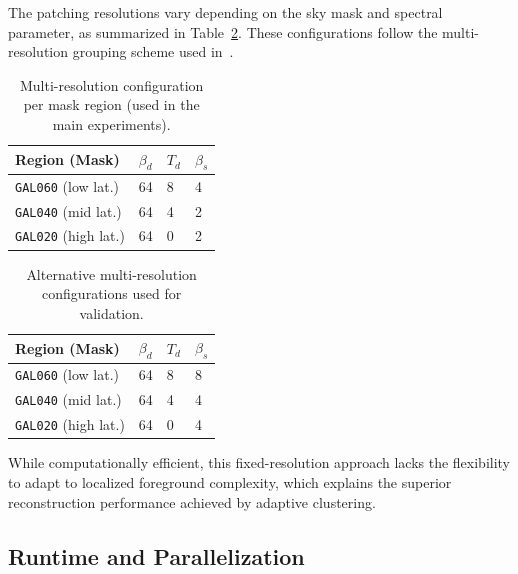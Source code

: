 \documentclass[fleqn,usenatbib]{mnras}
\begin{document}
The patching resolutions vary depending on the sky mask and spectral parameter, as summarized in Table~\ref{tab:multires_config}. These configurations follow the multi-resolution grouping scheme used in~\citep{LiteBIRD_PTEP_2022}.

\begin{table}
    \centering
    \small
    \caption{Multi-resolution configuration per mask region (used in the main experiments).}
    \begin{tabular}{@{}p{3.5cm}|p{1.5cm}@{}|p{1.5cm}@{}|p{1.5cm}@{}}
        \toprule
        \textbf{Region (Mask)} & \( \beta_d \) & \( T_d \) & \( \beta_s \) \\
        \midrule
        \texttt{GAL060} (low lat.)  & 64 & 8 & 4 \\
        \texttt{GAL040} (mid lat.)  & 64 & 4 & 2 \\
        \texttt{GAL020} (high lat.) & 64 & 0 & 2 \\
        \bottomrule
    \end{tabular}
    \label{tab:multires_config}
\end{table}

\begin{table}
    \centering
    \small
    \caption{Alternative multi-resolution configurations used for validation.}
    \begin{tabular}{@{}p{3.5cm}|p{1.5cm}@{}|p{1.5cm}@{}|p{1.5cm}@{}}
        \toprule
        \textbf{Region (Mask)} & \( \beta_d \) & \( T_d \) & \( \beta_s \) \\
        \midrule
        \texttt{GAL060} (low lat.)  & 64 & 8 & 8 \\
        \texttt{GAL040} (mid lat.)  & 64 & 4 & 4 \\
        \texttt{GAL020} (high lat.) & 64 & 0 & 4 \\
        \bottomrule
    \end{tabular}
    \label{tab:multires_config}
\end{table}

While computationally efficient, this fixed-resolution approach lacks the flexibility to adapt to localized foreground complexity, which explains the superior reconstruction performance achieved by adaptive clustering.

\subsection{Runtime and Parallelization}
\label{subsec:runtime}
\end{document}
